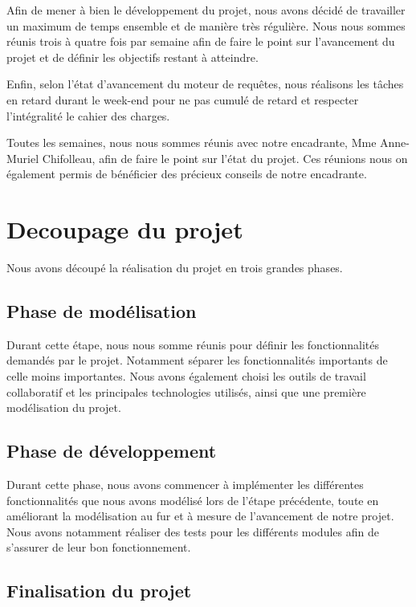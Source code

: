 \documentclass[oneside,13pt,a4paper]{report}
\begin{document}
Afin de mener à bien le développement du projet, nous avons décidé de travailler un maximum de temps ensemble et de manière très régulière. Nous nous sommes réunis trois à quatre fois par semaine afin de faire le point sur l’avancement du projet et de définir les objectifs restant à atteindre.

Enfin, selon l’état d’avancement du moteur de requêtes, nous réalisons les tâches en retard durant le week-end pour ne pas cumulé de retard et respecter l’intégralité le cahier des charges.

Toutes les semaines, nous nous sommes réunis avec notre encadrante, Mme Anne-Muriel Chifolleau, afin de faire le point sur l’état du projet. Ces réunions nous on également permis de bénéficier des précieux conseils de notre encadrante.

\section{Decoupage du projet}

Nous avons découpé la réalisation du projet en trois grandes phases.

\subsection{Phase de modélisation}

Durant cette étape, nous nous somme réunis pour définir les fonctionnalités demandés par le projet. Notamment séparer les fonctionnalités importants de celle moins importantes. Nous avons également choisi les outils de travail collaboratif et les principales technologies utilisés, ainsi que une première modélisation du projet.

\subsection{Phase de développement}

Durant cette phase, nous avons commencer à implémenter les différentes fonctionnalités que nous avons modélisé lors de l’étape précédente, toute en améliorant la modélisation au fur et à mesure de l’avancement de notre projet. Nous avons notamment réaliser des tests pour les différents modules afin de s’assurer de leur bon fonctionnement.

\subsection{Finalisation du projet}
\end{document}

